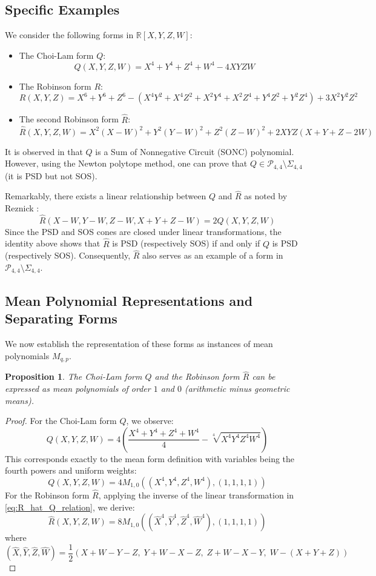 \documentclass{article}
\newtheorem{proposition}{Proposition}
\begin{document}
\subsection{Specific Examples}
We consider the following forms in $\mathbb{R}[X,Y,Z,W]$:
\begin{itemize}
    \item The Choi-Lam form $Q$:
    \[
        Q(X,Y,Z,W) = X^4 + Y^4 + Z^4 + W^4 - 4XYZW
    \]
    \item The Robinson form $R$:
    \[
        R(X,Y,Z) = X^6 + Y^6 + Z^6 - (X^4 Y^2 + X^4 Z^2 + X^2 Y^4 + X^2 Z^4 + Y^4 Z^2 + Y^2 Z^4) + 3X^2 Y^2 Z^2
    \]
    \item The second Robinson form $\hat{R}$:
    \[
        \hat{R}(X,Y,Z,W) = X^2(X-W)^2 + Y^2(Y-W)^2 + Z^2(Z-W)^2 + 2XYZ(X+Y+Z-2W)
    \]
\end{itemize}

It is observed in \cite{MSc01} that $Q$ is a Sum of Nonnegative Circuit (SONC) polynomial. However, using the 
Newton polytope method, one can prove that $Q \in \mathcal{P}_{4,4} \setminus \Sigma_{4,4}$ (it is PSD but not SOS).

Remarkably, there exists a linear relationship between $Q$ and $\hat{R}$ as noted by Reznick \cite{Rez07}:
\begin{equation}\label{eq:R_hat_Q_relation}
    \hat{R}(X-W, Y-W, Z-W, X+Y+Z-W) = 2Q(X,Y,Z,W)
\end{equation}
Since the PSD and SOS cones are closed under linear transformations, the identity above shows that $\hat{R}$ is PSD 
(respectively SOS) if and only if $Q$ is PSD (respectively SOS). Consequently, $\hat{R}$ also serves as an example of a 
form in $\mathcal{P}_{4,4} \setminus \Sigma_{4,4}$.

\subsection{Mean Polynomial Representations and Separating Forms}

We now establish the representation of these forms as instances of mean polynomials $M_{q,p}$.

\begin{proposition}
The Choi-Lam form $Q$ and the Robinson form $\hat{R}$ can be expressed as mean polynomials of order $1$ and $0$ 
(arithmetic minus geometric means).
\end{proposition}

\begin{proof}
For the Choi-Lam form $Q$, we observe:
\[
    Q(X, Y, Z, W) = 4 \left( \frac{X^4 + Y^4 + Z^4 + W^4}{4} - \sqrt[4]{X^4 Y^4 Z^4 W^4} \right)
\]
This corresponds exactly to the mean form definition with variables being the fourth powers and uniform weights:
\[
    Q(X, Y, Z, W) = 4 M_{1,0}((X^4, Y^4, Z^4, W^4), (1, 1, 1, 1))
\]
For the Robinson form $\hat{R}$, applying the inverse of the linear transformation in \eqref{eq:R_hat_Q_relation}, 
we derive:
\[
    \hat{R}(X,Y,Z,W) = 8 M_{1,0}((\hat{X}^4, \hat{Y}^4, \hat{Z}^4, \hat{W}^4), (1,1,1,1))
\]
where 
\[
    (\hat{X}, \hat{Y}, \hat{Z}, \hat{W}) = \frac{1}{2}(X+W-Y-Z, \; Y+W-X-Z, \; Z+W-X-Y, \; W-(X+Y+Z))
\]
\end{proof}
\end{document}
